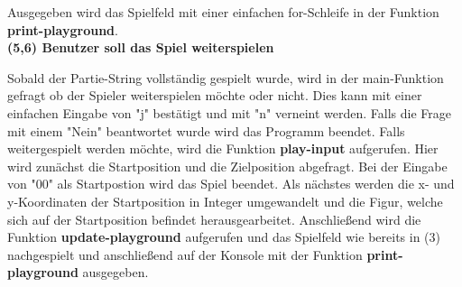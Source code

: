 Ausgegeben wird das Spielfeld mit einer einfachen for-Schleife in der Funktion \textbf{print-playground}.\\

\textbf{(5,6) Benutzer soll das Spiel weiterspielen}

Sobald der Partie-String vollständig gespielt wurde, wird in der main-Funktion gefragt ob der Spieler weiterspielen möchte oder nicht. Dies kann mit einer einfachen Eingabe von "j" bestätigt und mit "n" verneint werden. Falls die Frage mit einem "Nein" beantwortet wurde wird das Programm beendet. Falls weitergespielt werden möchte, wird die Funktion \textbf{play-input} aufgerufen.
Hier wird zunächst die Startposition und die Zielposition abgefragt. Bei der Eingabe von "00" als Startpostion wird das Spiel beendet.
Als nächstes werden die x- und y-Koordinaten der Startposition in Integer umgewandelt und die Figur, welche sich auf der Startposition befindet herausgearbeitet. Anschließend wird die Funktion \textbf{update-playground} aufgerufen und das Spielfeld wie bereits in (3) nachgespielt und anschließend auf der Konsole mit der Funktion \textbf{print-playground} ausgegeben.


